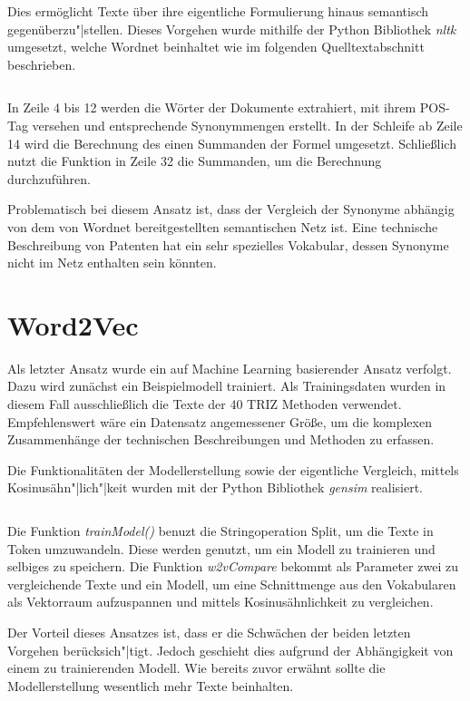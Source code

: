 \documentclass[11pt,a4paper]{article}
\begin{document}
Dies ermöglicht Texte über ihre eigentliche Formulierung hinaus semantisch
gegenüberzu"|stellen.  Dieses Vorgehen wurde mithilfe der Python Bibliothek
\textit{nltk} umgesetzt, welche Wordnet beinhaltet wie im folgenden
Quelltextabschnitt beschrieben.

\inputminted[frame=lines, framesep=2mm, linenos, breaklines]{python}{./listings/wordnet.py}

In Zeile 4 bis 12 werden die Wörter der Dokumente extrahiert, mit ihrem
POS-Tag versehen und entsprechende Synonymmengen erstellt.  In der Schleife ab
Zeile 14 wird die Berechnung des einen Summanden der Formel umgesetzt.
Schließlich nutzt die Funktion in Zeile 32 die Summanden, um die Berechnung
durchzuführen.

Problematisch bei diesem Ansatz ist, dass der Vergleich der Synonyme abhängig
von dem von Wordnet bereitgestellten semantischen Netz ist.  Eine technische
Beschreibung von Patenten hat ein sehr spezielles Vokabular, dessen Synonyme
nicht im Netz enthalten sein könnten.

\section{Word2Vec}

Als letzter Ansatz wurde ein auf Machine Learning basierender Ansatz verfolgt.
Dazu wird zunächst ein Beispielmodell trainiert.  Als Trainingsdaten wurden in
diesem Fall ausschließlich die Texte der 40 TRIZ Methoden verwendet.
Empfehlenswert wäre ein Datensatz angemessener Größe, um die komplexen
Zusammenhänge der technischen Beschreibungen und Methoden zu erfassen.

Die Funktionalitäten der Modellerstellung sowie der eigentliche Vergleich,
mittels Kosinusähn"|lich"|keit wurden mit der Python Bibliothek
\textit{gensim} realisiert.

\inputminted[frame=lines, framesep=2mm, linenos, breaklines]{python}{./listings/word2vec.py}

Die Funktion \textit{trainModel()} benuzt die Stringoperation Split, um die
Texte in Token umzuwandeln.  Diese werden genutzt, um ein Modell zu trainieren
und selbiges zu speichern.  Die Funktion \textit{w2vCompare} bekommt als
Parameter zwei zu vergleichende Texte und ein Modell, um eine Schnittmenge aus
den Vokabularen als Vektorraum aufzuspannen und mittels Kosinusähnlichkeit zu
vergleichen.

Der Vorteil dieses Ansatzes ist, dass er die Schwächen der beiden letzten
Vorgehen berücksich"|tigt.  Jedoch geschieht dies aufgrund der Abhängigkeit
von einem zu trainierenden Modell.  Wie bereits zuvor erwähnt sollte die
Modellerstellung wesentlich mehr Texte beinhalten.
\end{document}
